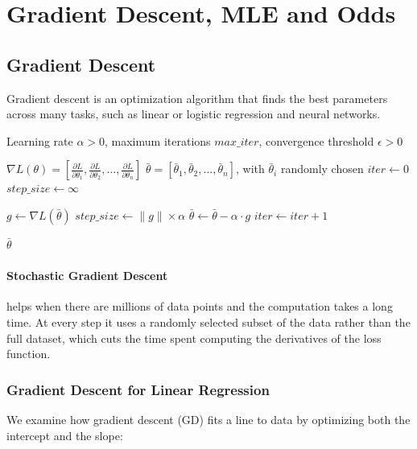 \section{Gradient Descent, MLE and Odds}
\subsection{Gradient Descent}
Gradient descent is an optimization algorithm that finds the best parameters across many tasks, such as linear or logistic regression and neural networks.
\begin{algorithm}
\caption{Gradient Descent Optimization}
\begin{algorithmic}[1]
\Require Learning rate $\alpha > 0$, maximum iterations $max\_iter$, convergence threshold $\epsilon > 0$

\State $\nabla L(\theta) = [\frac{\partial L}{\partial \theta_1}, \frac{\partial L}{\partial \theta_2}, \ldots, \frac{\partial L}{\partial \theta_n}]$ 
\State $\bar\theta=[\bar\theta_1,\bar\theta_2,...,\bar\theta_n]$, with  $\bar\theta_i$ randomly chosen
\State $iter \gets 0$
\State $step\_size \gets \infty$

    \State $g \gets \nabla L(\bar\theta)$ 
    \State $step\_size \gets \|g\| \times \alpha$ 
    \State $\bar\theta \gets \bar\theta - \alpha \cdot g$ 
    \State $iter \gets iter + 1$
\EndWhile

\Return $\bar\theta$
\end{algorithmic}
\end{algorithm}
\paragraph{Stochastic Gradient Descent} helps when there are millions of data points and the computation takes a long time. At every step it uses a randomly selected subset of the data rather than the full dataset, which cuts the time spent computing the derivatives of the loss function.

\subsubsection{Gradient Descent for Linear Regression}We examine how gradient descent (GD) fits a line to data by optimizing both the intercept and the slope:

